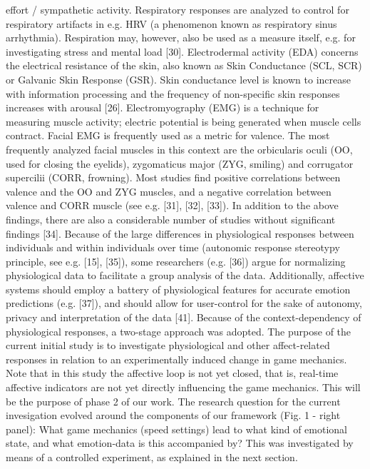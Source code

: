 effort / sympathetic activity. Respiratory responses are analyzed to control for respiratory artifacts in e.g. HRV (a phenomenon known as respiratory sinus arrhythmia). Respiration may, however, also be used as a measure itself, e.g. for investigating stress and mental load [30]. Electrodermal activity (EDA) concerns the electrical resistance of the skin, also known as Skin Conductance (SCL, SCR) or Galvanic Skin Response (GSR). Skin conductance level is known to increase with information processing and the frequency of non-specific skin responses increases with arousal [26]. Electromyography (EMG) is a technique for measuring muscle activity; electric potential is being generated when muscle cells contract. Facial EMG is frequently used as a metric for valence. The most frequently analyzed facial muscles in this context are the orbicularis oculi (OO, used for closing the eyelids), zygomaticus major (ZYG, smiling) and corrugator supercilii (CORR, frowning). Most studies find positive correlations between valence and the OO and ZYG muscles, and a negative correlation between valence and CORR muscle (see e.g. [31], [32], [33]). In addition to the above findings, there are also a considerable number of studies without significant findings [34]. Because of the large differences in physiological responses between individuals and within individuals over time (autonomic response stereotypy principle, see e.g. [15], [35]), some researchers (e.g. [36]) argue for normalizing physiological data to facilitate a group analysis of the data. Additionally, affective systems should employ a battery of physiological features for accurate emotion predictions (e.g. [37]), and should allow for user-control for the sake of autonomy, privacy and interpretation of the data [41]. Because of the context-dependency of physiological responses, a two-stage approach was adopted. The purpose of the current initial study is to investigate physiological and other affect-related responses in relation to an experimentally induced change in game mechanics. Note that in this study the affective loop is not yet closed, that is, real-time affective indicators are not yet directly influencing the game mechanics. This will be the purpose of phase 2 of our work. The research question for the current invesigation evolved around the components of our framework (Fig. 1 - right panel): What game mechanics (speed settings) lead to what kind of emotional state, and what emotion-data is this accompanied by? This was investigated by means of a controlled experiment, as explained in the next section.


